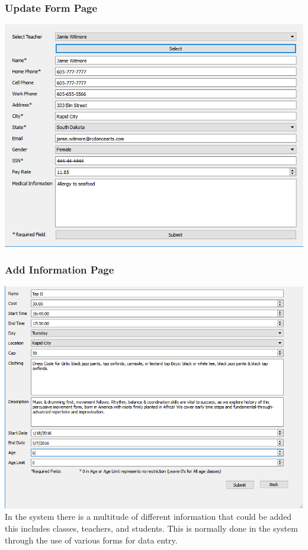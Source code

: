 \subsubsection{Update Form Page}
\includegraphics[scale=0.5]{pics/Update_Teacher.png}\\

\subsubsection{Add Information Page}
\includegraphics[scale=0.5]{pics/Add_class.png}\\
In the system there is a  multitude of different information that could be added this includes classes, teachers, and students. This is normally done in the system through the use of various forms for data entry.

